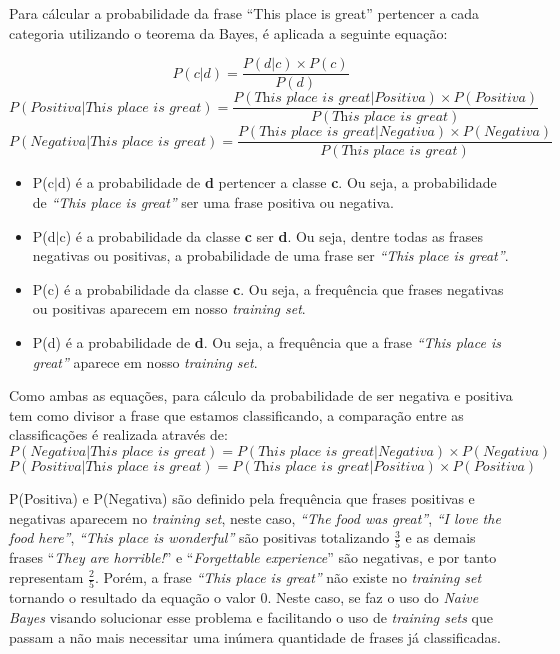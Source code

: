 Para cálcular a probabilidade da frase ``This place is great'' pertencer a cada categoria
utilizando o teorema da Bayes, é aplicada a seguinte equação:

\[ P(c|d)
=
\frac{P(d|c) \times P(c)}{P(d)}
\]
\[ P(Positiva|\textit{This place is great})
=
\frac{P(\textit{This place is great}|Positiva) \times
P(Positiva)}{P(\textit{This place is great})}
\]
\[ P(Negativa|\textit{This place is great})
=
\frac{P(\textit{This place is great}|Negativa) \times
P(Negativa)}{P(\textit{This place is great})}
\]


\begin{itemize}
  \item P(c$\vert$d) é a probabilidade de \textbf{d} pertencer a classe
  \textbf{c}. Ou seja, a probabilidade de \textit{``This place is great''} ser
  uma frase positiva ou negativa.
  \item P(d$\vert$c) é a probabilidade da classe \textbf{c} ser \textbf{d}. Ou
  seja, dentre todas as frases negativas ou positivas, a probabilidade de
  uma frase ser \textit{``This place is great''}.
  \item P(c) é a probabilidade da classe \textbf{c}. Ou seja, a frequência que
  frases negativas ou positivas aparecem em nosso \textit{training
  set}.
  \item P(d) é a probabilidade de \textbf{d}. Ou seja, a frequência que
  a frase \textit{``This place is great''} aparece em nosso \textit{training
  set}.
\end{itemize}

Como ambas as equações, para cálculo da probabilidade de ser negativa e positiva
tem como divisor a frase que estamos classificando, a comparação entre as
classificações é realizada através de:
\[ P(Negativa|\textit{This place is great})
=
P(\textit{This place is great}|Negativa) \times
P(Negativa)
\]
\[ P(Positiva|\textit{This place is great})
=
P(\textit{This place is great}|Positiva) \times
P(Positiva)
\]

P(Positiva) e P(Negativa) são definido pela frequência que frases positivas e
negativas aparecem no \textit{training set}, neste caso, \textit{``The food was
great''}, \textit{``I love the food here''}, \textit{``This place is
wonderful''} são positivas totalizando $\frac{3}{5}$ e as demais
frases ``\textit{They are horrible!}'' e ``\textit{Forgettable experience}'' são
negativas, e por tanto representam $\frac{2}{5}$.
Porém, a frase \textit{``This place is great''} não existe no \textit{training
set} tornando o resultado da equação o valor 0. Neste caso, se faz o uso do
\textit{Naive Bayes} visando solucionar esse problema e
facilitando o uso de \textit{training sets} que passam a não mais necessitar uma
inúmera quantidade de frases já classificadas.

